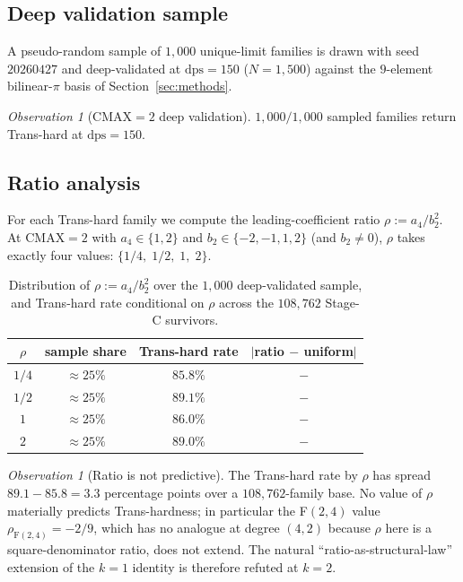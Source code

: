 \documentclass[11pt,a4paper]{amsart}
\theoremstyle{definition}
\theoremstyle{remark}
\newtheorem{observation}[theorem]{Observation}
\newcommand{\dps}{\mathrm{dps}}
\begin{document}
\subsection{Deep validation sample}

A pseudo-random sample of $1{,}000$ unique-limit families is drawn with
seed $20260427$ and deep-validated at $\dps=150$ ($N=1{,}500$) against the
$9$-element bilinear-$\pi$ basis of Section~\ref{sec:methods}.

\begin{observation}[CMAX$=2$ deep validation]\label{obs:cmax2dv}
$1{,}000/1{,}000$ sampled families return Trans-hard at $\dps=150$.
\end{observation}

\subsection{Ratio analysis}

For each Trans-hard family we compute the leading-coefficient ratio
$\rho := a_4/b_2^2$.  At $\mathrm{CMAX}=2$ with $a_4\in\{1,2\}$ and
$b_2\in\{-2,-1,1,2\}$ (and $b_2\ne 0$), $\rho$ takes exactly four
values: $\{1/4,\;1/2,\;1,\;2\}$.

\begin{table}[h]
\centering
\caption{Distribution of $\rho := a_4/b_2^2$ over the $1{,}000$ deep-validated
sample, and Trans-hard rate conditional on $\rho$ across the
$108{,}762$ Stage-C survivors.}
\label{tab:rho}
\begin{tabular}{cccc}
\toprule
$\rho$ & sample share & Trans-hard rate & $|$ratio $-$ uniform$|$ \\
\midrule
$1/4$ & $\approx 25\%$ & $85.8\%$ & $-$ \\
$1/2$ & $\approx 25\%$ & $89.1\%$ & $-$ \\
$1$   & $\approx 25\%$ & $86.0\%$ & $-$ \\
$2$   & $\approx 25\%$ & $89.0\%$ & $-$ \\
\bottomrule
\end{tabular}
\end{table}

\begin{observation}[Ratio is not predictive]\label{obs:rho-flat}
The Trans-hard rate by $\rho$ has spread $89.1 - 85.8 = 3.3$
percentage points over a $108{,}762$-family base.  No value of $\rho$
materially predicts Trans-hardness; in particular the F$(2,4)$ value
$\rho_{\text{F$(2,4)$}} = -2/9$, which has no analogue at degree $(4,2)$
because $\rho$ here is a square-denominator ratio, does not extend.
The natural ``ratio-as-structural-law'' extension of the $k=1$
identity is therefore refuted at $k=2$.
\end{observation}
\end{document}
